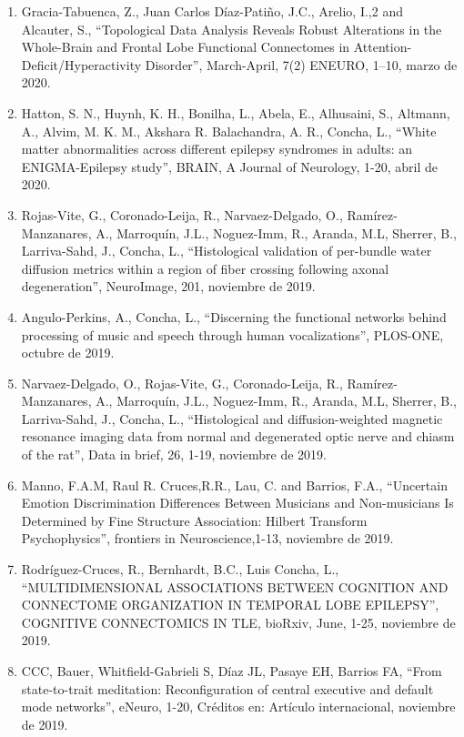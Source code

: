 \begin{enumerate}
\item Gracia-Tabuenca, Z., Juan Carlos Díaz-Patiño, J.C., Arelio, I.,2 and Alcauter, S., “Topological Data Analysis Reveals 
Robust Alterations in the Whole-Brain and Frontal Lobe Functional Connectomes in Attention-Deficit/Hyperactivity Disorder”, 
March-April, 7(2) ENEURO, 1–10, marzo de 2020.

\item Hatton, S. N., Huynh, K. H., Bonilha, L., Abela, E., Alhusaini, S., Altmann, A., Alvim, M. K. M., Akshara R. 
Balachandra, A. R., Concha, L., “White matter abnormalities across different epilepsy syndromes in adults: an 
ENIGMA-Epilepsy study”, BRAIN, A Journal of Neurology, 1-20, abril de 2020.

\item Rojas-Vite, G., Coronado-Leija, R., Narvaez-Delgado, O., Ramírez-Manzanares, A., Marroquín, J.L., Noguez-Imm, R., 
Aranda, M.L, Sherrer, B., Larriva-Sahd, J., Concha, L., “Histological validation of per-bundle water diffusion metrics 
within a region of fiber crossing following axonal degeneration”, NeuroImage, 201, noviembre de 2019.

\item Angulo-Perkins, A., Concha, L., “Discerning the functional networks behind processing of music and speech through 
human 
vocalizations”, PLOS-ONE, octubre de 2019.

\item Narvaez-Delgado, O., Rojas-Vite, G., Coronado-Leija, R., Ramírez-Manzanares, A., Marroquín, J.L., Noguez-Imm, R., 
Aranda, M.L, Sherrer, B., Larriva-Sahd, J., Concha, L., “Histological and diffusion-weighted magnetic resonance imaging 
data from normal and degenerated optic nerve and chiasm of the rat”, Data in brief, 26, 1-19, noviembre de 2019.

\item Manno, F.A.M, Raul R. Cruces,R.R., Lau, C. and Barrios, F.A., “Uncertain Emotion Discrimination Differences Between 
Musicians and Non-musicians Is Determined by Fine Structure Association: Hilbert Transform Psychophysics”, frontiers in 
Neuroscience,1-13, noviembre de 2019.

\item Rodríguez-Cruces, R., Bernhardt, B.C., Luis Concha, L., “MULTIDIMENSIONAL ASSOCIATIONS BETWEEN COGNITION AND 
CONNECTOME 
ORGANIZATION IN TEMPORAL LOBE EPILEPSY”, COGNITIVE CONNECTOMICS IN TLE, bioRxiv, June, 1-25, noviembre de 2019.

\item CCC, Bauer, Whitfield-Gabrieli S, Díaz JL, Pasaye EH, Barrios FA, “From state-to-trait meditation: Reconfiguration of 
central executive and default mode networks”, eNeuro, 1-20, Créditos en: Artículo internacional, noviembre de 2019.


\end{enumerate}
